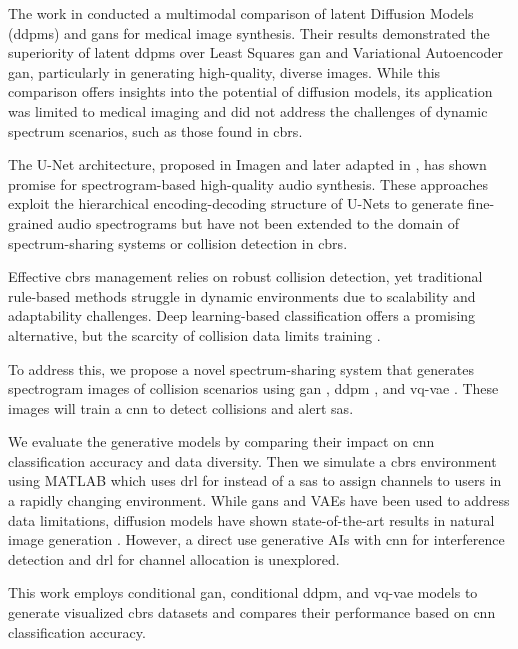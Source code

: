 The work in \cite{9} conducted a multimodal comparison of latent Diffusion Models (\gls{ddpm}s) and \gls{gan}s for medical image synthesis. Their results demonstrated the superiority of latent \gls{ddpm}s over Least Squares \gls{gan} and Variational Autoencoder \gls{gan}, particularly in generating high-quality, diverse images. While this comparison offers insights into the potential of diffusion models, its application was limited to medical imaging and did not address the challenges of dynamic spectrum scenarios, such as those found in \gls{cbrs}.

The U-Net architecture, proposed in Imagen \cite{16} and later adapted in \cite{17}, has shown promise for spectrogram-based high-quality audio synthesis. These approaches exploit the hierarchical encoding-decoding structure of U-Nets to generate fine-grained audio spectrograms but have not been extended to the domain of spectrum-sharing systems or collision detection in \gls{cbrs}.

Effective \gls{cbrs} management relies on robust collision detection, yet traditional rule-based methods struggle in dynamic environments due to scalability and adaptability challenges. Deep learning-based classification offers a promising alternative, but the scarcity of collision data limits training \cite{5}.  

To address this, we propose a novel spectrum-sharing system that generates spectrogram images of collision scenarios using \gls{gan} \cite{6}, \gls{ddpm} \cite{7}, and \gls{vq-vae} \cite{8}. These images will train a \gls{cnn} to detect collisions and alert \gls{sas}. 

We evaluate the generative models by comparing their impact on \gls{cnn} classification accuracy and data diversity. Then we simulate a \gls {cbrs} environment using MATLAB which uses \gls{drl} for instead of a \gls{sas} to assign channels to users in a rapidly changing environment. While \gls{gan}s and VAEs have been used to address data limitations, diffusion models have shown state-of-the-art results in natural image generation \cite{9}. However, a direct use generative AIs with \gls{cnn} for interference detection and \gls{drl} for channel allocation is unexplored.  

This work employs conditional \gls{gan}, conditional \gls{ddpm}, and \gls{vq-vae} models to generate visualized \gls{cbrs} datasets and compares their performance based on \gls{cnn} classification accuracy.  

